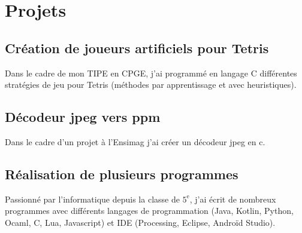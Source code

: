 \documentclass[11pt,oneside,a4paper,titlepage]{article}
\begin{document}
\section*{Projets}
\subsection*{Création de joueurs artificiels pour Tetris}
Dans le cadre de mon TIPE en CPGE, j'ai programmé en langage C différentes stratégies de jeu pour Tetris (méthodes par apprentissage et avec heuristiques).
\subsection*{Décodeur jpeg vers ppm}
Dans le cadre d'un projet à l'Ensimag j'ai créer un décodeur jpeg en c.
\subsection*{Réalisation de plusieurs programmes}
Passionné par l'informatique depuis la classe de $5^{\text{e}}$, j'ai écrit de nombreux programmes avec différents langages de programmation (Java, Kotlin, Python, Ocaml, C, Lua, Javascript) et IDE (Processing, Eclipse, Androïd Studio).
\end{document}
